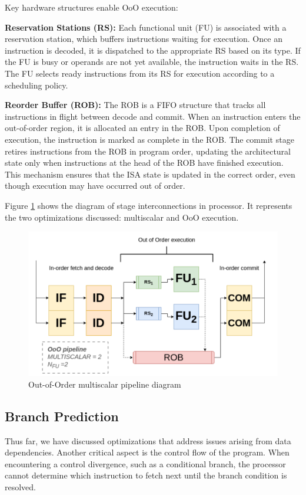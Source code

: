 Key hardware structures enable OoO execution:

\textbf{Reservation Stations (RS):} Each functional unit (FU) is associated with a reservation station, which buffers instructions waiting for execution. Once an instruction is decoded, it is dispatched to the appropriate RS based on its type. If the FU is busy or operands are not yet available, the instruction waits in the RS. The FU selects ready instructions from its RS for execution according to a scheduling policy.

\textbf{Reorder Buffer (ROB):} The ROB is a FIFO structure that tracks all instructions in flight between decode and commit. When an instruction enters the out-of-order region, it is allocated an entry in the ROB. Upon completion of execution, the instruction is marked as complete in the ROB. The commit stage retires instructions from the ROB in program order, updating the architectural state only when instructions at the head of the ROB have finished execution. This mechanism ensures that the ISA state is updated in the correct order, even though execution may have occurred out of order.

Figure \ref{fig:ooo-pipeline} shows the diagram of stage interconnections in processor. It represents the two optimizations discussed: multiscalar and OoO execution.

\begin{figure}[H]
    \centering
    \includegraphics[width=0.6 \textwidth]{figures/ooo-pipeline.png}
    \caption{Out-of-Order multiscalar pipeline diagram}
    \label{fig:ooo-pipeline}
\end{figure}

\subsection{Branch Prediction}

Thus far, we have discussed optimizations that address issues arising from data dependencies. Another critical aspect is the control flow of the program. When encountering a control divergence, such as a conditional branch, the processor cannot determine which instruction to fetch next until the branch condition is resolved.

